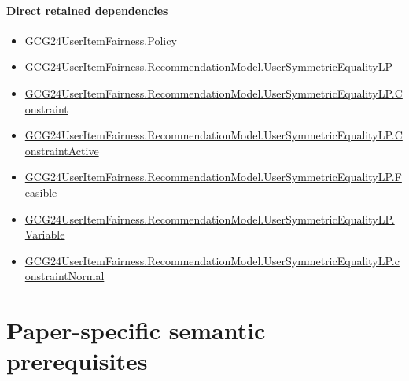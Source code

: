 \documentclass[10pt]{article}
\begin{document}
\paragraph{Direct retained dependencies}
\begin{itemize}\raggedright
\item \hyperlink{governing-declaration-34ca6b905b48428a}{GCG24\allowbreak{}User\allowbreak{}Item\allowbreak{}Fairness.\allowbreak{}Policy}
\item \hyperlink{governing-declaration-e6768094bf04aa6e}{GCG24\allowbreak{}User\allowbreak{}Item\allowbreak{}Fairness.\allowbreak{}Recommendation\allowbreak{}Model.\allowbreak{}User\allowbreak{}Symmetric\allowbreak{}Equality\allowbreak{}LP}
\item \hyperlink{governing-declaration-0f04a0045c6f5ef6}{GCG24\allowbreak{}User\allowbreak{}Item\allowbreak{}Fairness.\allowbreak{}Recommendation\allowbreak{}Model.\allowbreak{}User\allowbreak{}Symmetric\allowbreak{}Equality\allowbreak{}LP.\allowbreak{}Constraint}
\item \hyperlink{governing-declaration-f9a90e59bf54c22b}{GCG24\allowbreak{}User\allowbreak{}Item\allowbreak{}Fairness.\allowbreak{}Recommendation\allowbreak{}Model.\allowbreak{}User\allowbreak{}Symmetric\allowbreak{}Equality\allowbreak{}LP.\allowbreak{}Constraint\allowbreak{}Active}
\item \hyperlink{governing-declaration-2ea552d3f4c33289}{GCG24\allowbreak{}User\allowbreak{}Item\allowbreak{}Fairness.\allowbreak{}Recommendation\allowbreak{}Model.\allowbreak{}User\allowbreak{}Symmetric\allowbreak{}Equality\allowbreak{}LP.\allowbreak{}Feasible}
\item \hyperlink{governing-declaration-9e9379f327ed5d53}{GCG24\allowbreak{}User\allowbreak{}Item\allowbreak{}Fairness.\allowbreak{}Recommendation\allowbreak{}Model.\allowbreak{}User\allowbreak{}Symmetric\allowbreak{}Equality\allowbreak{}LP.\allowbreak{}Variable}
\item \hyperlink{governing-declaration-b2765b720ca5ceea}{GCG24\allowbreak{}User\allowbreak{}Item\allowbreak{}Fairness.\allowbreak{}Recommendation\allowbreak{}Model.\allowbreak{}User\allowbreak{}Symmetric\allowbreak{}Equality\allowbreak{}LP.\allowbreak{}constraint\allowbreak{}Normal}
\end{itemize}
\clearpage
\hypertarget{paper-prerequisite-section-5ef5ef0364b6939c}{}
\section*{Paper-specific semantic prerequisites}
\hypertarget{paper-prerequisite-4c12034215b920ef}{}
\end{document}
